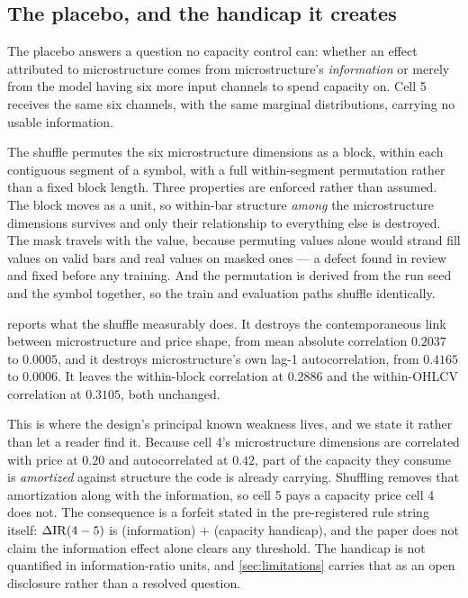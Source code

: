 \subsection{The placebo, and the handicap it creates}
\label{sec:setup-placebo}
\label{sec:placebo}

The placebo answers a question no capacity control can: whether an effect attributed to
microstructure comes from microstructure's \emph{information} or merely from the model having six
more input channels to spend capacity on. Cell 5 receives the same six channels, with the same
marginal distributions, carrying no usable information.

The shuffle permutes the six microstructure dimensions as a block, within each contiguous segment
of a symbol, with a full within-segment permutation rather than a fixed block length. Three
properties are enforced rather than assumed. The block moves as a unit, so within-bar structure
\emph{among} the microstructure dimensions survives and only their relationship to everything else
is destroyed. The mask travels with the value, because permuting values alone would strand fill
values on valid bars and real values on masked ones --- a defect found in review and fixed before
any training. And the permutation is derived from the run seed and the symbol together, so the
train and evaluation paths shuffle identically.

 reports what the shuffle measurably does. It destroys the contemporaneous link
between microstructure and price shape, from mean absolute correlation $0.2037$ to $0.0005$, and
it destroys microstructure's own lag-1 autocorrelation, from $0.4165$ to $0.0006$. It leaves the
within-block correlation at $0.2886$ and the within-OHLCV correlation at $0.3105$, both unchanged.

This is where the design's principal known weakness lives, and we state it rather than let a
reader find it. Because cell 4's microstructure dimensions are correlated with price at $0.20$ and
autocorrelated at $0.42$, part of the capacity they consume is \emph{amortized} against structure
the code is already carrying. Shuffling removes that amortization along with the information, so
cell 5 pays a capacity price cell 4 does not. The consequence is a forfeit stated in the
pre-registered rule string itself: $\Delta\mathrm{IR}(4-5)$ is (information) $+$ (capacity handicap), and
the paper does not claim the information effect alone clears any threshold.
The handicap is not quantified in information-ratio units, and \cref{sec:limitations} carries that
as an open disclosure rather than a resolved question.

